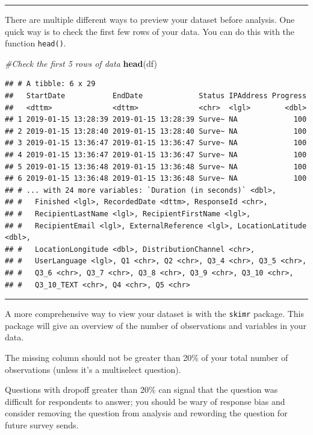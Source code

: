 \documentclass[]{book}
\newenvironment{Shaded}{\begin{snugshade}}{\end{snugshade}}
\newcommand{\CommentTok}[1]{\textcolor[rgb]{0.56,0.35,0.01}{\textit{#1}}}
\newcommand{\KeywordTok}[1]{\textcolor[rgb]{0.13,0.29,0.53}{\textbf{#1}}}
\newcommand{\NormalTok}[1]{#1}
\begin{document}
\begin{center}\rule{0.5\linewidth}{\linethickness}\end{center}

There are multiple different ways to preview your dataset before analysis. One quick way is to check the first few rows of your data. You can do this with the function \texttt{head()}.

\begin{Shaded}
\begin{Highlighting}[]
\CommentTok{#Check the first 5 rows of data}
\KeywordTok{head}\NormalTok{(df)}
\end{Highlighting}
\end{Shaded}

\begin{verbatim}
## # A tibble: 6 x 29
##   StartDate           EndDate             Status IPAddress Progress
##   <dttm>              <dttm>              <chr>  <lgl>        <dbl>
## 1 2019-01-15 13:28:39 2019-01-15 13:28:39 Surve~ NA             100
## 2 2019-01-15 13:28:40 2019-01-15 13:28:40 Surve~ NA             100
## 3 2019-01-15 13:36:47 2019-01-15 13:36:47 Surve~ NA             100
## 4 2019-01-15 13:36:47 2019-01-15 13:36:47 Surve~ NA             100
## 5 2019-01-15 13:36:48 2019-01-15 13:36:48 Surve~ NA             100
## 6 2019-01-15 13:36:48 2019-01-15 13:36:48 Surve~ NA             100
## # ... with 24 more variables: `Duration (in seconds)` <dbl>,
## #   Finished <lgl>, RecordedDate <dttm>, ResponseId <chr>,
## #   RecipientLastName <lgl>, RecipientFirstName <lgl>,
## #   RecipientEmail <lgl>, ExternalReference <lgl>, LocationLatitude <dbl>,
## #   LocationLongitude <dbl>, DistributionChannel <chr>,
## #   UserLanguage <lgl>, Q1 <chr>, Q2 <chr>, Q3_4 <chr>, Q3_5 <chr>,
## #   Q3_6 <chr>, Q3_7 <chr>, Q3_8 <chr>, Q3_9 <chr>, Q3_10 <chr>,
## #   Q3_10_TEXT <chr>, Q4 <chr>, Q5 <chr>
\end{verbatim}

\begin{center}\rule{0.5\linewidth}{\linethickness}\end{center}

A more comprehensive way to view your dataset is with the \texttt{skimr} package. This package will give an overview of the number of observations and variables in your data.

The missing column should not be greater than 20\% of your total number of observations (unless it's a multiselect question).

Questions with dropoff greater than 20\% can signal that the question was difficult for respondents to answer; you should be wary of response bias and consider removing the question from analysis and rewording the question for future survey sends.
\end{document}
